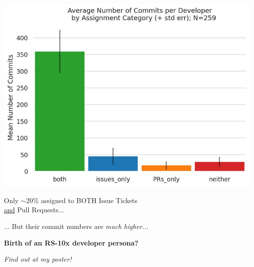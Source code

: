 \documentclass[25pt, a3paper, landscape, margin=10mm, innermargin=25mm, blockverticalspace=25mm, subcolspace=28mm, dvipsnames]{tikzposter} %
\begin{document}
{\begin{multicols}{2}
{    \begin{tikzfigure}[]
        \includegraphics[width=0.9\linewidth]{AverageCommitsByCategory.jpg}
    \end{tikzfigure}
    
    Only $\sim$20\% assigned to BOTH Issue Tickets \\
    \underline{and} Pull Requests... 
    
    \vspace{0.20em}
    ... But their commit numbers are \textit{much higher...}\par 

    \vspace{1em}
    \textbf{Birth of an RS-10x developer persona?}
    
    \vspace{0.5em}
    \textit{Find out at my poster!}
    }
    \end{multicols}
}
\end{document}
